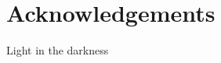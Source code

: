 \thispagestyle{empty}
\vspace{-3cm}
\section*{\centering Acknowledgements}

Light in the darkness

\thispagestyle{empty}


\newpage

